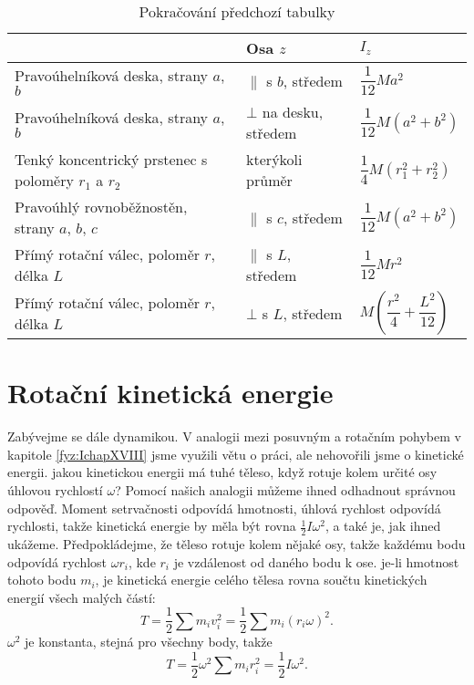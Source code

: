     \begin{table*}
      \centering
      \setlength{\tabcolsep}{2pt}
      \begin{tabular}{|l|l|l|}
        \hline
        \rowcolor{CornflowerBlue}{těleso} & {Osa \(z\)} & \(I_z\)                  \\
        \hline
        Pravoúhelníková deska, strany \(a\), \(b\)
          & \(\parallel\) s \(b\), středem & \(\dfrac{1}{12}Ma^2\)                 \\
        \hline 
        Pravoúhelníková deska, strany \(a\), \(b\)  
          & \(\bot\) na desku, středem & \(\dfrac{1}{12}M(a^2 + b^2)\)             \\
        \hline 
        Tenký koncentrický prstenec s poloměry \(r_1\) a \(r_2\)  
          &  kterýkoli průměr  & \(\dfrac{1}{4}M(r_1^2 + r_2^2)\)                  \\
        \hline 
        Pravoúhlý rovnoběžnostěn, strany \(a\), \(b\), \(c\)  
          & \(\parallel\) s \(c\), středem & \(\dfrac{1}{12}M(a^2 + b^2)\)         \\
        \hline 
        Přímý rotační válec, poloměr \(r\), délka \(L\) 
          & \(\parallel\) s \(L\), středem & \(\dfrac{1}{12}Mr^2\)                 \\
        \hline
        Přímý rotační válec, poloměr \(r\), délka \(L\) 
          & \(\bot\) s \(L\), středem & \(M\left(\dfrac{r^2}{4} + \dfrac{L^2}{12}\right)\)                                          \\
        \hline 
      \end{tabular}
      \caption{Pokračování předchozí tabulky}\label{fyz:tab015}
    \end{table*}

  \section{Rotační kinetická energie}\label{fyz:IchapXIXsecIV}
    Zabývejme se dále dynamikou. V analogii mezi posuvným a rotačním pohybem v kapitole
    \ref{fyz:IchapXVIII} jsme využili větu o práci, ale nehovořili jsme o kinetické energii. jakou
    kinetickou energii má tuhé těleso, když rotuje kolem určité osy úhlovou rychlostí \(\omega\)?
    Pomocí našich analogii můžeme ihned odhadnout správnou odpověď. Moment setrvačnosti odpovídá
    hmotnosti, úhlová rychlost odpovídá rychlosti, takže kinetická energie by měla být rovna
    \(\frac{1}{2}Iω^2\), a také je, jak ihned ukážeme. Předpokládejme, že těleso rotuje kolem nějaké
    osy, takže každému bodu odpovídá rychlost \(ωr_i\), kde \(r_i\) je vzdálenost od daného bodu k
    ose. je-li hmotnost tohoto bodu \(m_i\), je kinetická energie celého tělesa rovna součtu
    kinetických energií všech malých částí:
    \begin{equation*}
      T=\frac{1}{2}∑m_iv^2_i=\frac{1}{2}∑m_i(r_iω)^2.
    \end{equation*}
    \(ω^2\) je konstanta, stejná pro všechny body, takže
    \begin{equation}
      T=\frac{1}{2}ω^2∑m_ir^2_i=\frac{1}{2}Iω^2.
    \end{equation}

